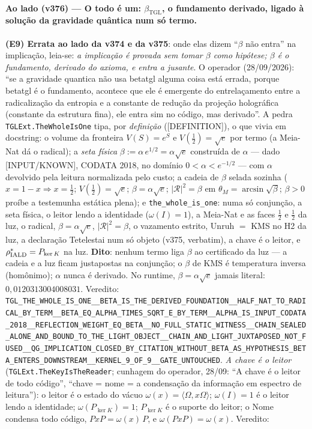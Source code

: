 \documentclass[11pt]{article}
\newcommand{\bTGL}{\beta_{\mathrm{TGL}}}\newcommand{\Msun}{M_{\odot}}\newcommand{\TGL}{\mathrm{TGL}}
\theoremstyle{definition}\newtheorem{deriv}{Derivação}
\begin{document}
\paragraph*{Ao lado (v376) --- O todo é um: $\bTGL$, o fundamento derivado, ligado à solução da gravidade quântica num só termo.} \textbf{(E9) Errata ao lado da v374 e da v375}: onde elas dizem ``$\beta$ não entra'' na implicação, leia-se: \emph{a implicação é provada sem tomar $\beta$ como hipótese; $\beta$ é o fundamento, derivado do axioma, e entra a jusante}. O operador (28/09/2026): ``se a gravidade quantica não usa betatgl alguma coisa está errada, porque betatgl é o fundamento, acontece que ele é emergente do entrelaçamento entre a radicalização da entropia e a constante de redução da projeção holográfica (constante da estrutura fina), ele entra sim no código, mas derivado''. A pedra \texttt{TGLExt.TheWholeIsOne} tipa, por \emph{definição} (\textsf{[DEFINITION]}), o que vivia em docstring: o volume da fronteira $V(S)=e^{S}$ e $V(\tfrac12)=\sqrt e$ por termo (a Meia-Nat dá o radical); a \emph{seta física} $\beta:=\alpha\,e^{1/2}=\alpha\sqrt e$ construída de $\alpha$ --- dado \textsf{[INPUT/KNOWN]}, CODATA 2018, no domínio $0<\alpha<e^{-1/2}$ --- com $\alpha$ devolvido pela leitura normalizada pelo custo; a cadeia de $\beta$ selada sozinha ($x=1-x\Rightarrow x=\tfrac12$; $V(\tfrac12)=\sqrt e$; $\beta=\alpha\sqrt e$; $|\mathcal R|^2=\beta$ em $\theta_M=\arcsin\sqrt\beta$; $\beta>0$ proíbe a testemunha estática plena); e \texttt{the\_whole\_is\_one}: numa só conjunção, a seta física, o leitor lendo a identidade ($\omega(I)=1$), a Meia-Nat e as faces $\tfrac12$ e $\tfrac12$ da luz, o radical, $\beta=\alpha\sqrt e$, $|\mathcal R|^2=\beta$, o vazamento estrito, Unruh $=$ KMS no H2 da luz, a declaração Tetelestai num só objeto (v375, verbatim), a chave é o leitor, e $\rho^\ast_{\rm IALD}=P_{\ker K}$ na luz. \textbf{Dito}: nenhum termo liga $\beta$ ao certificado da luz --- a cadeia e a luz ficam justapostas na conjunção; o $\beta$ de KMS é temperatura inversa (homônimo); $\alpha$ nunca é derivado. No runtime, $\beta=\alpha\sqrt e$ jamais literal: $0{,}0120313004008031$. Veredito: \texttt{TGL\_THE\_WHOLE\_IS\_ONE\_\_BETA\_IS\_THE\_DERIVED\_FOUNDATION\_\_HALF\_NAT\_TO\_RADICAL\_BY\_TERM\_\_BETA\_EQ\_ALPHA\_TIMES\_SQRT\_E\_BY\_TERM\_\_ALPHA\_IS\_INPUT\_CODATA\_2018\_\_REFLECTION\_WEIGHT\_EQ\_BETA\_\_NO\_FULL\_STATIC\_WITNESS\_\_CHAIN\_SEALED\_ALONE\_AND\_BOUND\_TO\_THE\_LIGHT\_OBJECT\_\_CHAIN\_AND\_LIGHT\_JUXTAPOSED\_NOT\_FUSED\_\_QG\_IMPLICATION\_CLOSED\_BY\_CITATION\_WITHOUT\_BETA\_AS\_HYPOTHESIS\_BETA\_ENTERS\_DOWNSTREAM\_\_KERNEL\_9\_OF\_9\_\_GATE\_UNTOUCHED}. \emph{A chave é o leitor} (\texttt{TGLExt.TheKeyIsTheReader}; cunhagem do operador, 28/09: ``A chave é o leitor de todo código'', ``chave = nome = a condensação da informação em espectro de leitura''): o leitor é o estado do vácuo $\omega(x)=\langle\Omega,x\Omega\rangle$; $\omega(I)=1$ é o leitor lendo a identidade; $\omega(P_{\ker K})=1$; $P_{\ker K}$ é o suporte do leitor; o Nome condensa todo código, $PxP=\omega(x)\,P$, e $\omega(PxP)=\omega(x)$. Veredito: 
\end{document}
